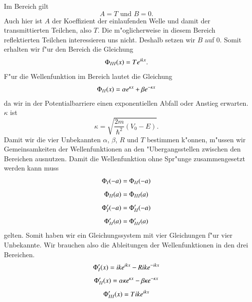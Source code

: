 \begin{refsection}
Im Bereich  gilt
\[
A = T \text{ und } B = 0.
\]
Auch hier ist $A$ der Koeffizient der einlaufenden Welle und damit der transmittierten Teilchen, also $T$. Die m"oglicherweise in diesem Bereich reflektierten Teilchen interessieren uns nicht. Deshalb setzen wir $B$ auf 0. Somit erhalten wir f"ur den Bereich  die Gleichung
\[
\Phi_\RM{3}(x) = Te^{ikx}.
\]
F"ur die Wellenfunktion im Bereich  lautet die Gleichung
\[
\Phi_\RM{2}(x) = \alpha e^{\kappa x} + \beta e^{-\kappa x}
\]
da wir in der Potentialbarriere einen exponentiellen Abfall oder Anstieg erwarten. $\kappa$ ist
\[
\kappa = \sqrt{\frac{2m}{\hbar^2}(V_0 - E)}.
\]
Damit wir die vier Unbekannten $\alpha$, $\beta$, $R$ und $T$ bestimmen k"onnen, m"ussen wir Gemeinsamkeiten der Wellenfunktionen an den "Ubergangsstellen zwischen den Bereichen ausnutzen. Damit die Wellenfunktion ohne Spr"unge zusammengesetzt werden kann muss
\[
\Phi_\RM{1}(-a) = \Phi_\RM{2}(-a)
\]
\[
\Phi_\RM{2}(a) = \Phi_\RM{3}(a)
\]
\[
\Phi_\RM{1}'(-a) = \Phi_\RM{2}'(-a)
\]
\[
\Phi_\RM{2}'(a) = \Phi_\RM{3}'(a)
\]
gelten. Somit haben wir ein Gleichungssystem mit vier Gleichungen f"ur vier Unbekannte. Wir brauchen also die Ableitungen der Wellenfunktionen in den drei Bereichen.
\[
\Phi_\RM{1}'(x) = ike^{ikx} - Rike^{-ikx}
\]
\[
\Phi_\RM{2}'(x) = \alpha \kappa e^{\kappa x} - \beta \kappa e^{-\kappa x}
\]
\[
\Phi_\RM{3}'(x) = Tike^{ikx}
\]





\printbibliography[heading=subbibliography]
\end{refsection}

